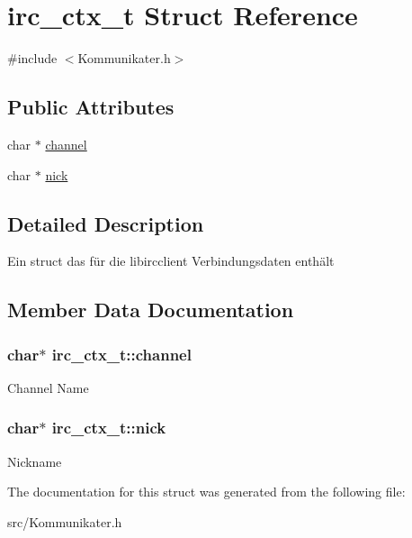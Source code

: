 \hypertarget{structirc__ctx__t}{\section{irc\-\_\-ctx\-\_\-t \-Struct \-Reference}
\label{structirc__ctx__t}
}


{\ttfamily \#include $<$\-Kommunikater.\-h$>$}

\subsection*{\-Public \-Attributes}
{\bf }\par
\begin{DoxyCompactItemize}
\item 
char $\ast$ \hyperlink{structirc__ctx__t_adab1f1a75877f72917167b372f546db9}{channel}
\item 
char $\ast$ \hyperlink{structirc__ctx__t_ab2ad2d142339cd2dbf30542193326757}{nick}
\end{DoxyCompactItemize}



\subsection{\-Detailed \-Description}
\-Ein struct das für die libircclient \-Verbindungsdaten enthält 

\subsection{\-Member \-Data \-Documentation}
\hypertarget{structirc__ctx__t_adab1f1a75877f72917167b372f546db9}{
\subsubsection[{channel}]{\setlength{\rightskip}{0pt plus 5cm}char$\ast$ {\bf irc\-\_\-ctx\-\_\-t\-::channel}}}\label{structirc__ctx__t_adab1f1a75877f72917167b372f546db9}
\-Channel \-Name \hypertarget{structirc__ctx__t_ab2ad2d142339cd2dbf30542193326757}{
\subsubsection[{nick}]{\setlength{\rightskip}{0pt plus 5cm}char$\ast$ {\bf irc\-\_\-ctx\-\_\-t\-::nick}}}\label{structirc__ctx__t_ab2ad2d142339cd2dbf30542193326757}
\-Nickname 

\-The documentation for this struct was generated from the following file\-:\begin{DoxyCompactItemize}
\item 
src/\-Kommunikater.\-h\end{DoxyCompactItemize}
